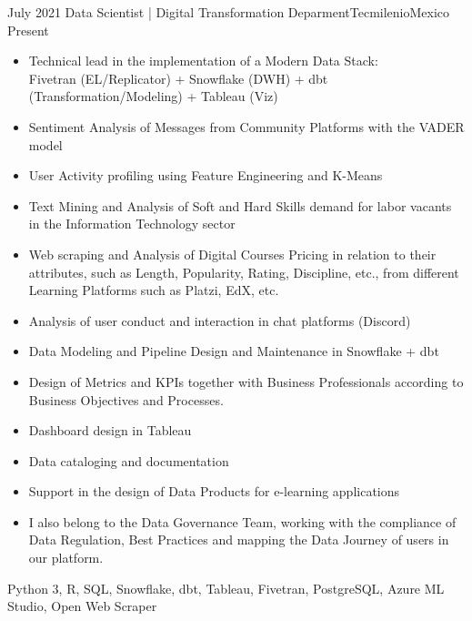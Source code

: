 %
%
%

\begin{experiences}
  \experience
    {July 2021}   {Data Scientist | Digital Transformation Deparment}{Tecmilenio}{Mexico}
    {Present} {
                      \begin{itemize}
                        \item Technical lead in the implementation of a Modern Data Stack: \\
                        Fivetran (EL/Replicator) + Snowflake (DWH) + dbt (Transformation/Modeling) + Tableau (Viz)
                        \item Sentiment Analysis of Messages from Community Platforms with the VADER model
                        \item User Activity profiling using Feature Engineering and K-Means
                        \item Text Mining and Analysis of Soft and Hard Skills demand for labor vacants \\
                        in the Information Technology sector
                        \item Web scraping and Analysis of Digital Courses Pricing in relation to their attributes, such as Length,
                        Popularity, Rating, Discipline, etc., from different Learning Platforms such as Platzi, EdX, etc.
                        \item Analysis of user conduct and interaction in chat platforms (Discord) 
                        \item Data Modeling and Pipeline Design and Maintenance in Snowflake + dbt
                        \item Design of Metrics and KPIs together with Business Professionals according to Business Objectives and Processes.
                        \item Dashboard design in Tableau
                        \item Data cataloging and documentation
                        \item Support in the design of Data Products for e-learning applications
                        \item I also belong to the Data Governance Team, working with the compliance of Data Regulation, Best Practices 
                        and mapping the Data Journey of users in our platform.
                      \end{itemize}
                    }
                    {Python 3, R, SQL, Snowflake, dbt, Tableau, Fivetran, PostgreSQL, Azure ML Studio, Open Web Scraper}
  \emptySeparator
  

\end{experiences}
